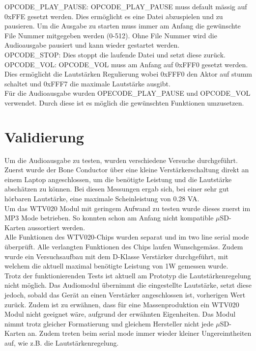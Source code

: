 OPCODE\_PLAY\_PAUSE: OPCODE\_PLAY\_PAUSE muss default mässig auf 0xFFE gesetzt werden. Dies ermöglicht es eine Datei abzuspielen und zu pausieren. Um die Ausgabe zu starten muss immer am Anfang die gewünschte File Nummer mitgegeben werden (0-512). Ohne File Nummer wird die Audioausgabe pausiert und kann wieder gestartet werden.  \\
OPCODE\_STOP: Dies stoppt die laufende Datei und setzt diese zurück.\\
OPCODE\_VOL: OPCODE\_VOL muss am Anfang auf 0xFFF0 gesetzt werden. Dies ermöglicht die Lautstärken Regulierung wobei 0xFFF0 den Aktor auf stumm schaltet und 0xFFF7 die maximale Lautstärke ausgibt. \\
Für die Audioausgabe wurden OPECODE\_PLAY\_PAUSE und OPCODE\_VOL verwendet. Durch diese ist es möglich die gewünschten Funktionen umzusetzen. 

\section{Validierung}
Um die Audioausgabe zu testen, wurden verschiedene Versuche durchgeführt. Zuerst wurde der Bone Conductor über eine kleine Verstärkerschaltung direkt an einem Laptop angeschlossen, um die benötigte Leistung und die Lautstärke abschätzen zu können. Bei diesen Messungen ergab sich, bei einer sehr gut hörbaren Lautstärke, eine maximale Scheinleistung von 0.28 VA.\\
Um das WTV020 Modul mit geringem Aufwand zu testen wurde dieses zuerst im MP3 Mode betrieben.
So konnten schon am Anfang nicht kompatible $\mu$SD-Karten aussortiert werden. \\
Alle Funktionen des WTV020-Chips wurden separat und im two line serial mode überprüft. Alle verlangten Funktionen des Chips laufen Wunschgemäss. Zudem wurde ein Versuchsaufbau mit dem D-Klasse Verstärker durchgeführt, mit welchem die aktuell maximal benötigte Leistung von 1W gemessen wurde. \\
Trotz der funktionierenden Tests ist aktuell am Prototyp die Lautstärkenregelung nicht möglich. Das Audiomodul übernimmt die eingestellte Lautstärke, setzt diese jedoch, sobald das Gerät an einen Verstärker angeschlossen ist, vorherigen Wert zurück. Zudem ist zu erwähnen, dass für eine Massenproduktion ein WTV020 Modul nicht geeignet wäre, aufgrund der erwähnten Eigenheiten. Das Modul nimmt trotz gleicher Formatierung und gleichem Hersteller nicht jede $\mu$SD-Karten an. Zudem treten beim serial mode immer wieder kleiner Ungereimtheiten auf, wie z.B. die Lautstärkenregelung. 
